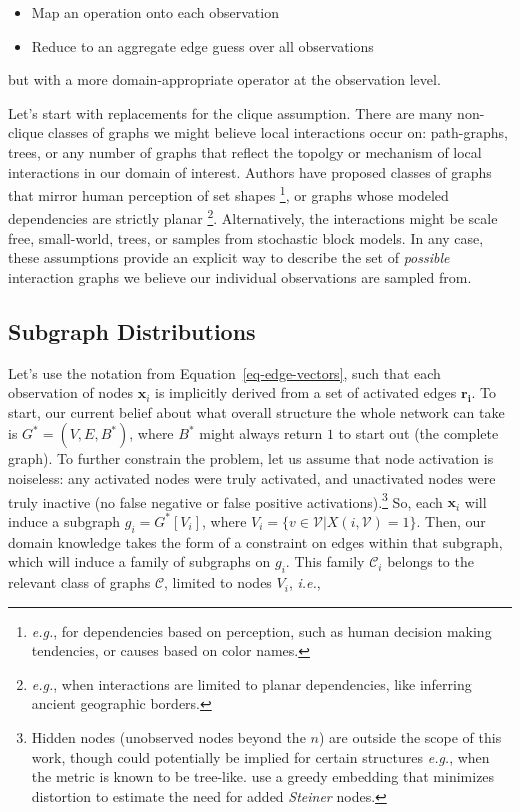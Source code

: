 \documentclass[%
	12pt,
		oneside,
		letterpaper
]{book}
\providecommand{\tightlist}{%
  \setlength{\itemsep}{0pt}\setlength{\parskip}{0pt}}\usepackage{longtable,booktabs,array}
\begin{document}
\begin{itemize}
\tightlist
\item
  Map an operation onto each observation
\item
  Reduce to an aggregate edge guess over all observations
\end{itemize}

but with a more domain-appropriate operator at the observation level.

Let's start with replacements for the clique assumption.
There are many non-clique classes of graphs we might believe local interactions occur on: path-graphs, trees, or any number of graphs that reflect the topolgy or mechanism of local interactions in our domain of interest.
Authors have proposed classes of graphs that mirror human perception of set shapes \autocite{Relativeneighborhoodgraphs_Jaromczyk1992}\footnote{
  \emph{e.g.}, for dependencies based on perception, such as human decision making tendencies, or causes based on color names.}, or graphs whose modeled dependencies are strictly planar \autocite{toolfilteringinformation_Tumminello2005}\footnote{
  \emph{e.g.}, when interactions are limited to planar dependencies, like inferring ancient geographic borders.}.
Alternatively, the interactions might be scale free, small-world, trees, or samples from stochastic block models.\autocite{StochasticblockmodelsFirst_Holland1983}
In any case, these assumptions provide an explicit way to describe the set of \emph{possible} interaction graphs we believe our individual observations are sampled from.

\subsection{Subgraph Distributions}\label{sec-subgraph-dists}

Let's use the notation from Equation~\ref{eq-edge-vectors}, such that each observation of nodes \(\mathbf{x}_i\) is implicitly derived from a set of activated edges \(\mathbf{r_i}\).
To start, our current belief about what overall structure the whole network can take is \(G^*=(V,E,B^*)\), where \(B^*\) might always return \(1\) to start out (the complete graph).
To further constrain the problem, let us assume that node activation is noiseless: any activated nodes were truly activated, and unactivated nodes were truly inactive (no false negative or false positive activations).\footnote{
  Hidden nodes (unobserved nodes beyond the \(n\)) are outside the scope of this work, though could potentially be implied for certain structures \emph{e.g.}, when the metric is known to be tree-like.
  \textcite{TreeIam_Sonthalia2020} use a greedy embedding that minimizes distortion to estimate the need for added \emph{Steiner} nodes.}
So, each \(\mathbf{x}_i\) will induce a subgraph \(g_i = G^*[V_i]\), where \(V_i = \{v\in \mathcal{V} | X(i,\mathcal{V})=1\}\).
Then, our domain knowledge takes the form of a constraint on edges within that subgraph, which will induce a family of subgraphs on \(g_i\).
This family \(\mathcal{C}_i\) belongs to the relevant class of graphs \(\mathcal{C}\), limited to nodes \(V_i\), \emph{i.e.},
\end{document}

